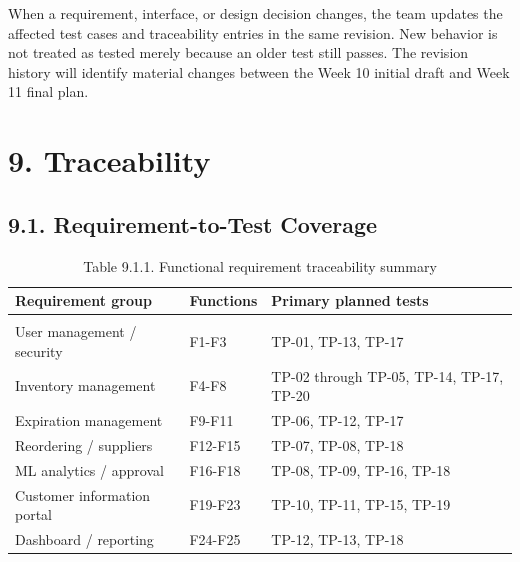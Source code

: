 When a requirement, interface, or design decision changes, the team updates the affected test cases and traceability entries in the same revision. New behavior is not treated as tested merely because an older test still passes. The revision history will identify material changes between the Week 10 initial draft and Week 11 final plan.

\clearpage
\section{9. Traceability}\label{traceability}

\subsection{9.1. Requirement-to-Test Coverage}\label{requirement-to-test-coverage}

{\def\LTcaptype{none} %
\begin{longtable}[]{|
  >{\raggedright\arraybackslash}m{}|
  >{\raggedright\arraybackslash}m{}|
  >{\raggedright\arraybackslash}m{}|}
\hline
\begin{minipage}[c]{\linewidth}\raggedright
\textbf{Requirement group}
\end{minipage} & \begin{minipage}[c]{\linewidth}\raggedright
\textbf{Functions}
\end{minipage} & \begin{minipage}[c]{\linewidth}\raggedright
\textbf{Primary planned tests}
\end{minipage} \\
\hline
\endhead

\caption*{Table 9.1.1. Functional requirement traceability summary}\\
\endlastfoot
User management / security & F1-F3 & TP-01, TP-13, TP-17 \\ \hline
Inventory management & F4-F8 & TP-02 through TP-05, TP-14, TP-17, TP-20 \\ \hline
Expiration management & F9-F11 & TP-06, TP-12, TP-17 \\ \hline
Reordering / suppliers & F12-F15 & TP-07, TP-08, TP-18 \\ \hline
ML analytics / approval & F16-F18 & TP-08, TP-09, TP-16, TP-18 \\ \hline
Customer information portal & F19-F23 & TP-10, TP-11, TP-15, TP-19 \\ \hline
Dashboard / reporting & F24-F25 & TP-12, TP-13, TP-18 \\ \hline
\end{longtable}
}

